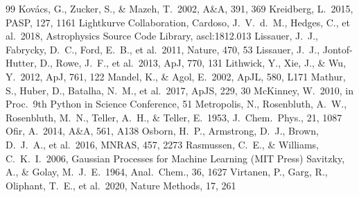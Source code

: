 \documentclass[11pt]{article}
\begin{document}
\begin{thebibliography}{99}
 Kov\'acs, G., Zucker, S., \& Mazeh, T.\ 2002, A\&A, 391, 369
 Kreidberg, L.\ 2015, PASP, 127, 1161
 Lightkurve Collaboration, Cardoso, J.~V.~d.~M., Hedges, C., et al.\ 2018, Astrophysics Source Code Library, ascl:1812.013
 Lissauer, J.~J., Fabrycky, D.~C., Ford, E.~B., et al.\ 2011, Nature, 470, 53
 Lissauer, J.~J., Jontof-Hutter, D., Rowe, J.~F., et al.\ 2013, ApJ, 770, 131
 Lithwick, Y., Xie, J., \& Wu, Y.\ 2012, ApJ, 761, 122
 Mandel, K., \& Agol, E.\ 2002, ApJL, 580, L171
 Mathur, S., Huber, D., Batalha, N.~M., et al.\ 2017, ApJS, 229, 30
 McKinney, W.\ 2010, in Proc.\ 9th Python in Science Conference, 51
 Metropolis, N., Rosenbluth, A.~W., Rosenbluth, M.~N., Teller, A.~H., \& Teller, E.\ 1953, J.\ Chem.\ Phys., 21, 1087
 Ofir, A.\ 2014, A\&A, 561, A138
 Osborn, H.~P., Armstrong, D.~J., Brown, D.~J.~A., et al.\ 2016, MNRAS, 457, 2273
 Rasmussen, C.~E., \& Williams, C.~K.~I.\ 2006, Gaussian Processes for Machine Learning (MIT Press)
 Savitzky, A., \& Golay, M.~J.~E.\ 1964, Anal.\ Chem., 36, 1627
 Virtanen, P., Garg, R., Oliphant, T.~E., et al.\ 2020, Nature Methods, 17, 261

\end{thebibliography}
\end{document}
